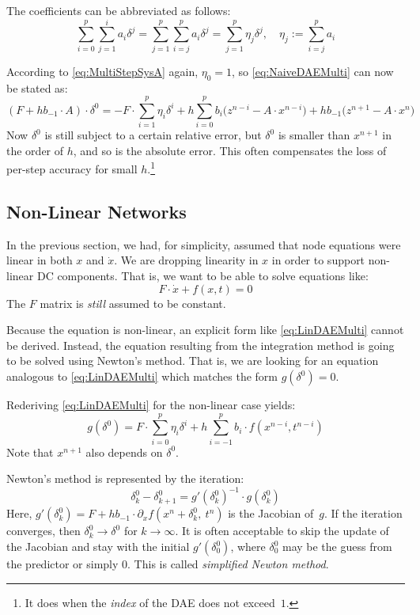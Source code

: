 The coefficients can be abbreviated as follows:
\[
\sum^p_{i=0} \sum^i_{j=1} a_i \delta^j
=\sum^p_{j=1} \sum^p_{i=j} a_i \delta^j
=\sum^p_{j=1} \eta_j \delta^j,\quad
\eta_j:=\sum^p_{i=j} a_i
\]

According to \eqref{eq:MultiStepSysA} again, $\eta_0=1$, so
\eqref{eq:NaiveDAEMulti} can now be stated as:
\begin{equation}
\label{eq:LinDAEMulti}
(F+hb_{-1}\cdot A)\cdot\delta^0 =
- F\cdot\sum^p_{i=1} \eta_i \delta^i
+ h \sum^p_{i=0}  b_i\bigl(
z^{n-i}-A\cdot x^{n-i} \bigr) + hb_{-1}\bigl(z^{n+1}-A\cdot x^n\bigr)
\end{equation}
Now $\delta^0$ is still subject to a certain relative error, but
$\delta^0$ is smaller than $x^{n+1}$ in the order of $h$, and so is the
absolute error.  This often compensates the loss of per-step accuracy
for small $h$.\footnote{It does when the \emph{index} of the DAE does
  not exceed~$1$.}

\subsection{Non-Linear Networks}

In the previous section, we had, for simplicity, assumed that node
equations were linear in both $x$ and $\dot{x}$.  We are dropping
linearity in $x$ in order to support non-linear DC components.  That
is, we want to be able to solve equations like:
\begin{equation}
F\cdot\dot{x}+f(x,t)=0
\end{equation}
The $F$ matrix is \emph{still} assumed to be constant.

Because the equation is non-linear, an explicit form like
\eqref{eq:LinDAEMulti} cannot be derived.  Instead, the equation
resulting from the integration method is going to be solved using
Newton's method.  That is, we are looking for an equation analogous to
\eqref{eq:LinDAEMulti} which matches the form $g(\delta^0)=0$.

Rederiving \eqref{eq:LinDAEMulti} for the non-linear case yields:
\begin{equation}
g(\delta^0)=
F\cdot\sum^p_{i=0} \eta_i \delta^i
+ h \sum^p_{i=-1}  b_i\cdot f(x^{n-i},t^{n-i})
\end{equation}
Note that $x^{n+1}$ also depends on $\delta^0$.

Newton's method is represented by the iteration:
\begin{equation}
\label{eq:MultiNewton}
\delta_k^0-\delta_{k+1}^0 = g'(\delta^0_k)^{-1} \cdot g(\delta^0_k)
\end{equation}
Here, $g'(\delta^0_k)=F+hb_{-1}\cdot \partial_x
f(x^n+\delta^0_k,~t^n)$ is the Jacobian of~$g$.  If the iteration
converges, then $\delta^0_k\to \delta^0$ for $k\to\infty$.  It is
often acceptable to skip the update of the Jacobian and stay with the
initial $g'(\delta^0_0)$, where $\delta^0_0$ may be the guess from the
predictor or simply $0$.  This is called \emph{simplified Newton
  method}.

